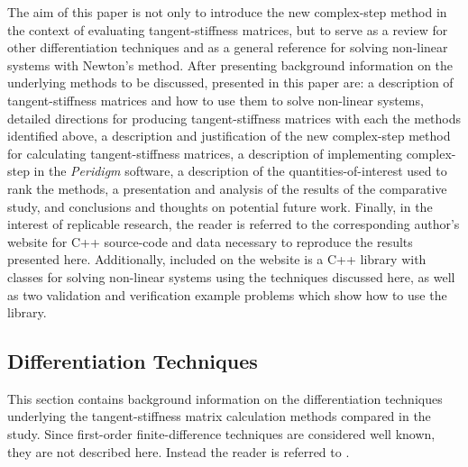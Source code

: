 \documentclass[preprint,12pt]{elsarticle}
\begin{document}
The aim of this paper is not only to introduce the new complex-step method in the context of evaluating tangent-stiffness matrices, but to serve as a review for other differentiation techniques and as a general reference for solving non-linear systems with Newton's method. After presenting background information on the underlying methods to be discussed, presented in this paper are: a description of tangent-stiffness matrices and how to use them to solve non-linear systems, detailed directions for producing tangent-stiffness matrices with each the methods identified above, a description and justification of the new complex-step method for calculating tangent-stiffness matrices, a description of implementing complex-step in the \emph{Peridigm} software, a description of the quantities-of-interest used to rank the methods, a presentation and analysis of the results of the comparative study, and conclusions and thoughts on potential future work. Finally, in the interest of replicable research, the reader is referred to the corresponding author's website for C++ source-code and data necessary to reproduce the results presented here. Additionally, included on the website is a C++ library with classes for solving non-linear systems using the techniques discussed here, as well as two validation and verification example problems which show how to use the library.

\subsection{Differentiation Techniques}

This section contains background information on the differentiation techniques underlying the tangent-stiffness matrix calculation methods compared in the study. Since first-order finite-difference techniques are considered well known, they are not described here. Instead the reader is referred to \cite[Chap. 4.1.3]{chapra2010}.
\end{document}
